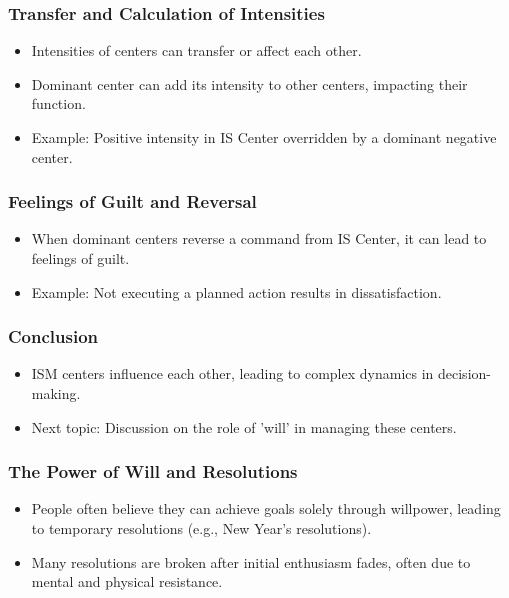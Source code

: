 \begin{frame}[fragile]\frametitle{Transfer and Calculation of Intensities}
    \begin{itemize}
        \item Intensities of centers can transfer or affect each other.
        \item Dominant center can add its intensity to other centers, impacting their function.
        \item Example: Positive intensity in IS Center overridden by a dominant negative center.
    \end{itemize}
\end{frame}

\begin{frame}[fragile]\frametitle{Feelings of Guilt and Reversal}
    \begin{itemize}
        \item When dominant centers reverse a command from IS Center, it can lead to feelings of guilt.
        \item Example: Not executing a planned action results in dissatisfaction.
    \end{itemize}
\end{frame}

\begin{frame}[fragile]\frametitle{Conclusion}
    \begin{itemize}
        \item ISM centers influence each other, leading to complex dynamics in decision-making.
        \item Next topic: Discussion on the role of 'will' in managing these centers.
    \end{itemize}
\end{frame}

\begin{frame}[fragile]\frametitle{The Power of Will and Resolutions}
    \begin{itemize}
        \item People often believe they can achieve goals solely through willpower, leading to temporary resolutions (e.g., New Year's resolutions).
        \item Many resolutions are broken after initial enthusiasm fades, often due to mental and physical resistance.
    \end{itemize}
\end{frame}

